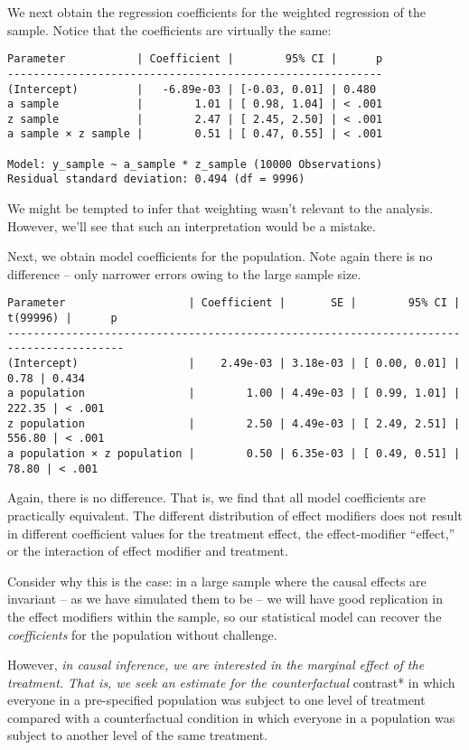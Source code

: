 \documentclass[
  single column]{article}
\begin{document}
We next obtain the regression coefficients for the weighted regression
of the sample. Notice that the coefficients are virtually the same:

\begin{verbatim}
Parameter           | Coefficient |        95% CI |      p
----------------------------------------------------------
(Intercept)         |   -6.89e-03 | [-0.03, 0.01] | 0.480 
a sample            |        1.01 | [ 0.98, 1.04] | < .001
z sample            |        2.47 | [ 2.45, 2.50] | < .001
a sample × z sample |        0.51 | [ 0.47, 0.55] | < .001

Model: y_sample ~ a_sample * z_sample (10000 Observations)
Residual standard deviation: 0.494 (df = 9996)
\end{verbatim}

We might be tempted to infer that weighting wasn't relevant to the
analysis. However, we'll see that such an interpretation would be a
mistake.

Next, we obtain model coefficients for the population. Note again there
is no difference -- only narrower errors owing to the large sample size.

\begin{verbatim}
Parameter                   | Coefficient |       SE |        95% CI | t(99996) |      p
----------------------------------------------------------------------------------------
(Intercept)                 |    2.49e-03 | 3.18e-03 | [ 0.00, 0.01] |     0.78 | 0.434 
a population                |        1.00 | 4.49e-03 | [ 0.99, 1.01] |   222.35 | < .001
z population                |        2.50 | 4.49e-03 | [ 2.49, 2.51] |   556.80 | < .001
a population × z population |        0.50 | 6.35e-03 | [ 0.49, 0.51] |    78.80 | < .001
\end{verbatim}

Again, there is no difference. That is, we find that all model
coefficients are practically equivalent. The different distribution of
effect modifiers does not result in different coefficient values for the
treatment effect, the effect-modifier ``effect,'' or the interaction of
effect modifier and treatment.

Consider why this is the case: in a large sample where the causal
effects are invariant -- as we have simulated them to be -- we will have
good replication in the effect modifiers within the sample, so our
statistical model can recover the \emph{coefficients} for the population
without challenge.

However, \emph{in causal inference, we are interested in the marginal
effect of the treatment. That is, we seek an estimate for the
counterfactual }contrast* in which everyone in a pre-specified
population was subject to one level of treatment compared with a
counterfactual condition in which everyone in a population was subject
to another level of the same treatment.
\end{document}
